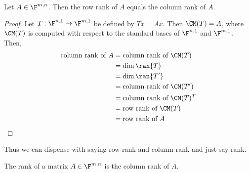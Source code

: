 \documentclass{article}
\begin{document}
  \begin{prop}
    Let $A \in \F^{m, n}$. Then the row rank of $A$ equals the column rank of $A$.
  \end{prop}
  \begin{proof}
    Let $T: \F^{n, 1} \to \F^{m, 1}$ be defined by $Tx = Ax$. Then $\CM(T) = A$, where $\CM(T)$ is computed with respect to the standard bases of $\F^{n, 1}$ and $\F^{m, 1}$. Then,
    \begin{align*}
      \text{column rank of }A & = \text{column rank of }\CM(T) \\
      & = \dim\ran{T} \\
      & = \dim\ran{T^{\prime}} \\
      & = \text{column rank of }\CM(T^{\prime}) \\
      & = \text{column rank of }\CM(T)^T \\
      & = \text{row rank of }\CM(T) \\
      & = \text{row rank of }A 
    \end{align*}
  \end{proof}
  Thus we can dispense with saying row rank and column rank and just say rank.
  \begin{prop}[rank]
    The rank of a matrix $A \in \F^{m, n}$ is the column rank of $A$.
  \end{prop}
\end{document}
